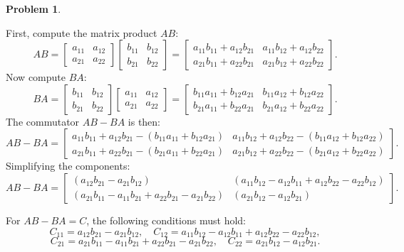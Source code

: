 \documentclass[12pt]{article}
\theoremstyle{definition}
\newtheorem{problem}{Problem}
\begin{document}
\begin{problem}
\begin{solution}
    First, compute the matrix product \( AB \):
    \[
    AB = \begin{bmatrix} a_{11} & a_{12} \\ a_{21} & a_{22} \end{bmatrix} \begin{bmatrix} b_{11} & b_{12} \\ b_{21} & b_{22} \end{bmatrix}
    = \begin{bmatrix} a_{11}b_{11} + a_{12}b_{21} & a_{11}b_{12} + a_{12}b_{22} \\ a_{21}b_{11} + a_{22}b_{21} & a_{21}b_{12} + a_{22}b_{22} \end{bmatrix}.
    \]
    Now compute \( BA \):
    \[
    BA = \begin{bmatrix} b_{11} & b_{12} \\ b_{21} & b_{22} \end{bmatrix} \begin{bmatrix} a_{11} & a_{12} \\ a_{21} & a_{22} \end{bmatrix}
    = \begin{bmatrix} b_{11}a_{11} + b_{12}a_{21} & b_{11}a_{12} + b_{12}a_{22} \\ b_{21}a_{11} + b_{22}a_{21} & b_{21}a_{12} + b_{22}a_{22} \end{bmatrix}.
    \]
    The commutator \( AB - BA \) is then:
    \[
    AB - BA = \begin{bmatrix}
    a_{11}b_{11} + a_{12}b_{21} - (b_{11}a_{11} + b_{12}a_{21}) & a_{11}b_{12} + a_{12}b_{22} - (b_{11}a_{12} + b_{12}a_{22}) \\
    a_{21}b_{11} + a_{22}b_{21} - (b_{21}a_{11} + b_{22}a_{21}) & a_{21}b_{12} + a_{22}b_{22} - (b_{21}a_{12} + b_{22}a_{22})
    \end{bmatrix}.
    \]
    Simplifying the components:
    \[
    AB - BA = \begin{bmatrix}
    (a_{12}b_{21} - a_{21}b_{12}) & (a_{11}b_{12} - a_{12}b_{11} + a_{12}b_{22} - a_{22}b_{12}) \\
    (a_{21}b_{11} - a_{11}b_{21} + a_{22}b_{21} - a_{21}b_{22}) & (a_{21}b_{12} - a_{12}b_{21})
    \end{bmatrix}.
    \]
    
    For \( AB - BA = C \), the following conditions must hold:
    \[
    C_{11} = a_{12}b_{21} - a_{21}b_{12}, \quad C_{12} = a_{11}b_{12} - a_{12}b_{11} + a_{12}b_{22} - a_{22}b_{12},
    \]
    \[    C_{21} = a_{21}b_{11} - a_{11}b_{21} + a_{22}b_{21} - a_{21}b_{22}, \quad C_{22} = a_{21}b_{12} - a_{12}b_{21}.    \]
    

\end{solution}
\end{problem}
\end{document}
